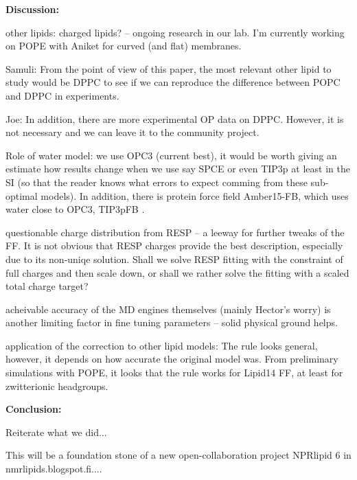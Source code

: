 \documentclass[aip,jcp,twocolumn]{revtex4}
\begin{document}
\textbf{Discussion:}

other lipids: charged lipids? -- ongoing research in our lab.
I'm currently working on POPE with Aniket for curved (and flat) membranes. 

Samuli: From the point of view of this paper, the most relevant other lipid to study would be DPPC to see if we can reproduce the difference between POPC and DPPC in experiments.

Joe: In addition, there are more experimental OP data on DPPC. However, it is not necessary and we can leave it to the community project. 

Role of water model: we use OPC3 (current best), it would be worth giving an estimate how results change when we use say SPCE or even TIP3p at least in the SI (so that the reader knows what errors to expect comming from these sub-optimal models). 
In addition, there is protein force field Amber15-FB, which uses water close to OPC3, TIP3pFB .

questionable charge distribution from RESP -- a leeway for further tweaks of the FF.
It is not obvious that RESP charges provide the best description, especially due to its non-uniqe solution. 
Shall we solve RESP fitting with the constraint of full charges and then scale down, or shall we rather solve the fitting with a scaled total charge target?

acheivable accuracy of the MD engines themselves (mainly Hector's worry) is another limiting factor in fine tuning parameters -- solid physical ground helps.

application of the correction to other lipid models: The rule looks general, however, it depends on how accurate the original model was.
From preliminary simulations with POPE, it looks that the rule works for Lipid14 FF, at least for zwitterionic headgroups.

\textbf{Conclusion:}

Reiterate what we did...

This will be a foundation stone of a new open-collaboration project NPRlipid 6 in nmrlipids.blogspot.fi....
















%
\end{document}
